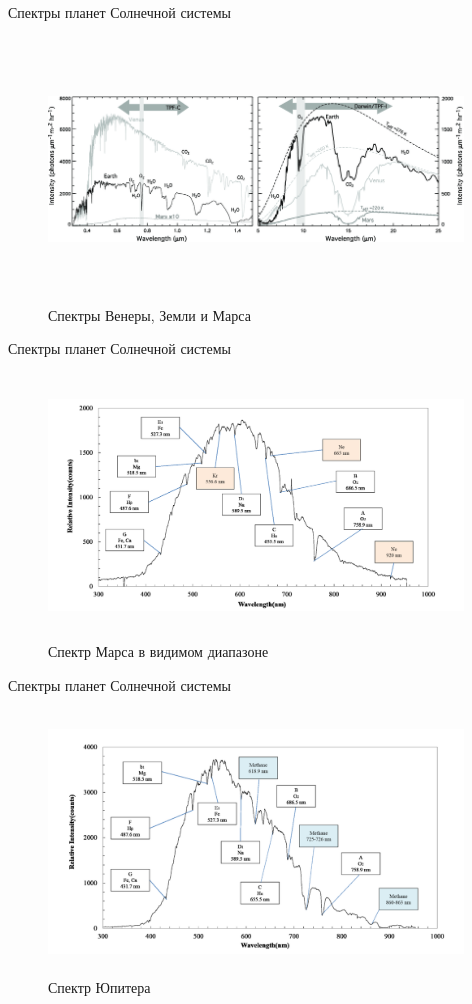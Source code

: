 \documentclass[
]{beamer}
\begin{document}
	\begin{frame}{Спектры планет Солнечной системы}
		\begin{figure}[H]
			\centering
			\includegraphics[width=11cm, height=7cm]{взм.png}
			\caption{Спектры Венеры, Земли и Марса}
		\end{figure}
	\end{frame}

	\begin{frame}{Спектры планет Солнечной системы}
		\begin{figure}[H]
			\centering
			\includegraphics[width=11cm, height=7cm]{марс.png}
			\caption{Спектр Марса в видимом диапазоне}
		\end{figure}
	\end{frame}

	\begin{frame}{Спектры планет Солнечной системы}
		\begin{figure}[H]
			\centering
			\includegraphics[width=11cm, height=7cm]{юпитер.png}
			\caption{Спектр Юпитера}
		\end{figure}
	\end{frame}
\end{document}
